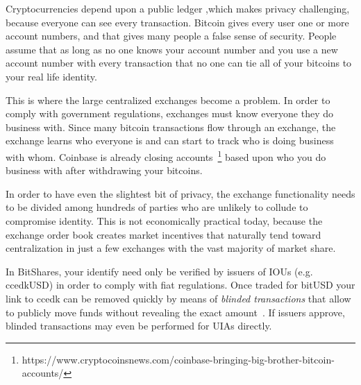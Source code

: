 Cryptocurrencies depend upon a public ledger ,which makes privacy challenging,
because everyone can see every transaction. Bitcoin gives every user one or
more account numbers, and that gives many people a false sense of security.
People assume that as long as no one knows your account number and you use a
new account number with every transaction that no one can tie all of your
bitcoins to your real life identity.

This is where the large centralized exchanges become a problem. In order to
comply with government regulations, exchanges must know everyone they do
business with. Since many bitcoin transactions flow through an exchange, the
exchange learns who everyone is and can start to track who is doing business
with whom. Coinbase is already closing
accounts~\footnote{https://www.cryptocoinsnews.com/coinbase-bringing-big-brother-bitcoin-accounts/}
based upon who you do business with after withdrawing your bitcoins.

In order to have even the slightest bit of privacy, the exchange functionality
needs to be divided among hundreds of parties who are unlikely to collude to
compromise identity. This is not economically practical today, because the
exchange order book creates market incentives that naturally tend toward
centralization in just a few exchanges with the vast majority of market share.

In BitShares, your identify need only be verified by issuers of IOUs (e.g.
ccedkUSD) in order to comply with fiat regulations. Once traded for bitUSD your
link to ccedk can be removed quickly by means of \emph{blinded transactions}
that allow to publicly move funds without revealing the exact
amount~\cite{bts:general,blindSigPaper}. If issuers approve, blinded
transactions may even be performed for UIAs directly.
